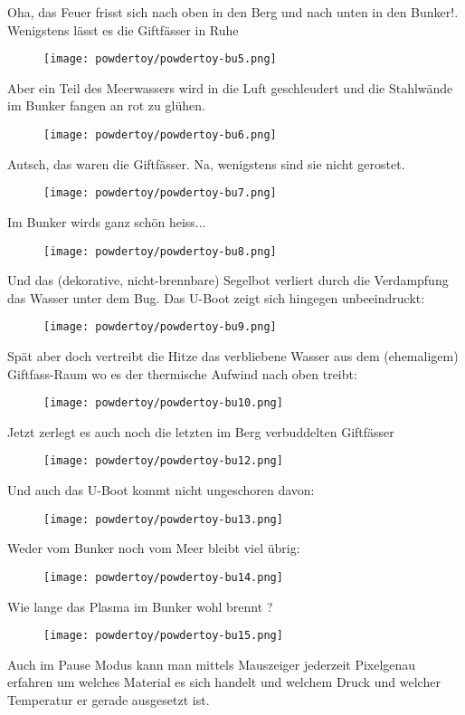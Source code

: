 \documentclass[10pt,a4paper,ngerman,twoside]{article} %
\begin{document}
Oha, das Feuer frisst sich nach oben in den Berg und nach unten in den Bunker!. Wenigstens lässt es die Giftfässer in Ruhe
\begin{figure}
\texttt{[image: powdertoy/powdertoy-bu5.png]}
\end{figure}
Aber ein Teil des Meerwassers wird in die Luft geschleudert und die Stahlwände im Bunker fangen an rot zu glühen.
\begin{figure}
\texttt{[image: powdertoy/powdertoy-bu6.png]}
\end{figure}
Autsch, das waren die Giftfässer. Na, wenigstens sind sie nicht gerostet.
\begin{figure}
\texttt{[image: powdertoy/powdertoy-bu7.png]}
\end{figure}
Im Bunker wirds ganz schön heiss...
\begin{figure}
\texttt{[image: powdertoy/powdertoy-bu8.png]}
\end{figure}
Und das (dekorative, nicht-brennbare) Segelbot verliert durch die Verdampfung das Wasser unter dem Bug. Das U-Boot zeigt sich hingegen unbeeindruckt:
\begin{figure}
\texttt{[image: powdertoy/powdertoy-bu9.png]}
\end{figure}
Spät aber doch vertreibt die Hitze das verbliebene Wasser aus dem (ehemaligem) Giftfass-Raum wo es der thermische Aufwind nach oben treibt:
\begin{figure}
\texttt{[image: powdertoy/powdertoy-bu10.png]}
\end{figure}
Jetzt zerlegt es auch noch die letzten im Berg verbuddelten Giftfässer
\begin{figure}
\texttt{[image: powdertoy/powdertoy-bu12.png]}
\end{figure}
Und auch das U-Boot kommt nicht ungeschoren davon:
\begin{figure}
\texttt{[image: powdertoy/powdertoy-bu13.png]}
\end{figure}
Weder vom Bunker noch vom Meer bleibt viel übrig:
\begin{figure}
\texttt{[image: powdertoy/powdertoy-bu14.png]}
\end{figure}
Wie lange das Plasma im Bunker wohl brennt ?
\begin{figure}
\texttt{[image: powdertoy/powdertoy-bu15.png]}
\end{figure}
Auch im Pause Modus kann man mittels Mauszeiger jederzeit Pixelgenau erfahren um welches Material es sich handelt und welchem Druck und welcher Temperatur er gerade ausgesetzt ist. 
\end{document}
